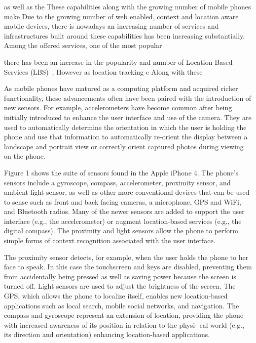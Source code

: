 as well as the 
These capabilities along with the
growing number of mobile phones make
Due to the growing number of web enabled, context and location aware mobile
devices, there is nowadays an increasing number of services and infrastructures built around these
capabilities has been increasing substantially. Among the offered
services, one of the most popular 


there has been an increase in the popularity and number of
Location Based Services (LBS)~\cite{wang2008location}. However as
location tracking c
Along with these 

As mobile phones have matured as a computing platform and acquired
richer functionality, these advancements often have been paired with
the introduction of new sensors. For example, accelerometers have
become common after being initially introduced to enhance the user
interface and use of the camera. They are used to automatically
determine the orientation in which the user is holding the phone and
use that information to automatically re-orient the display between a
landscape and portrait view or correctly orient captured photos during
viewing on the phone.

Figure 1 shows the suite of sensors found in
the Apple iPhone 4. The phone’s sensors include a gyroscope, compass,
accelerometer, proximity sensor, and ambient light sensor, as well as
other more conventional devices that can be used to sense such as
front and back facing cameras, a microphone, GPS and WiFi, and
Bluetooth radios. Many of the newer sensors are added to support the
user interface (e.g., the accelerometer) or augment location-based
services (e.g., the digital compass). The proximity and light sensors
allow the phone to perform simple forms of context recognition
associated with the user interface. 

The proximity sensor detects, for
example, when the user holds the phone to her face to speak. In this
case the touchscreen and keys are disabled, preventing them from
accidentally being pressed as well as saving power because the screen
is turned off. Light sensors are used to adjust the brightness of the
screen. The GPS, which allows the phone to localize itself, enables
new location-based applications such as local search, mobile social
networks, and navigation. The compass and gyroscope represent an
extension of location, providing the phone with increased awareness of
its position in relation to the physi- cal world (e.g., its direction
and orientation) enhancing location-based applications.

